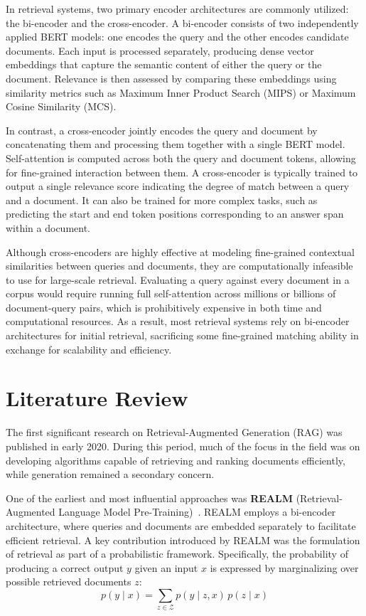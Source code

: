 \documentclass[twocolumn, 10pt]{article}
\begin{document}
In retrieval systems, two primary encoder architectures are commonly utilized: the bi-encoder and the cross-encoder. A bi-encoder consists of two independently applied BERT models: one encodes the query and the other encodes candidate documents. Each input is processed separately, producing dense vector embeddings that capture the semantic content of either the query or the document. Relevance is then assessed by comparing these embeddings using similarity metrics such as Maximum Inner Product Search (MIPS) or Maximum Cosine Similarity (MCS).

In contrast, a cross-encoder jointly encodes the query and document by concatenating them and processing them together with a single BERT model. Self-attention is computed across both the query and document tokens, allowing for fine-grained interaction between them. A cross-encoder is typically trained to output a single relevance score indicating the degree of match between a query and a document. It can also be trained for more complex tasks, such as predicting the start and end token positions corresponding to an answer span within a document.

Although cross-encoders are highly effective at modeling fine-grained contextual similarities between queries and documents, they are computationally infeasible to use for large-scale retrieval. Evaluating a query against every document in a corpus would require running full self-attention across millions or billions of document-query pairs, which is prohibitively expensive in both time and computational resources. As a result, most retrieval systems rely on bi-encoder architectures for initial retrieval, sacrificing some fine-grained matching ability in exchange for scalability and efficiency.

\section{Literature Review}

The first significant research on Retrieval-Augmented Generation (RAG) was published in early 2020. During this period, much of the focus in the field was on developing algorithms capable of retrieving and ranking documents efficiently, while generation remained a secondary concern.

One of the earliest and most influential approaches was \textbf{REALM} (Retrieval-Augmented Language Model Pre-Training)~\cite{guu2020realm}. REALM employs a bi-encoder architecture, where queries and documents are embedded separately to facilitate efficient retrieval. A key contribution introduced by REALM was the formulation of retrieval as part of a probabilistic framework. Specifically, the probability of producing a correct output \( y \) given an input \( x \) is expressed by marginalizing over possible retrieved documents \( z \):
\begin{equation*}
p(y \mid x) = \sum_{z \in \mathcal{Z}} p(y \mid z, x) \, p(z \mid x)
\end{equation*}
\end{document}
